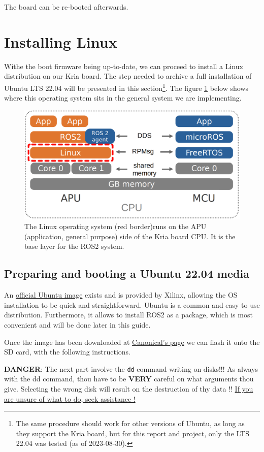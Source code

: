 \documentclass[10pt]{article}
\begin{document}
The board can be re-booted afterwards.
\pagebreak

\section{Installing Linux}
\label{sec:orgc3a362f}
Withe the boot firmware being up-to-date, we can proceed to install a Linux distribution
on our Kria board. The step needed to archive a full installation of Ubuntu LTS 22.04
will be presented in this section\footnote{The same procedure should work for other versions of Ubuntu, as long as they
support the Kria board, but for this report and project, only the LTS 22.04 was tested
(as of 2023-08-30).}. The figure \ref{fig:orga5df0c4} below shows
where this operating system sits in the general system we are implementing.

\begin{figure}[htbp]
\centering
\includegraphics[width=.6\textwidth]{./img/map_linux.png}
\caption{\label{fig:orga5df0c4}The Linux operating system (red border)runs on the APU (application, general purpose) side of the Kria board CPU. It is the base layer for the ROS2 system.}
\end{figure}

\subsection{Preparing and booting a Ubuntu 22.04 media}
\label{sec:orgf9fda62}
An \href{https://ubuntu.com/download/amd-xilinx}{official Ubuntu image} exists and is
provided by Xilinx, allowing the OS installation to be quick and
straightforward.
Ubuntu is a common and easy to use distribution. Furthermore,
it allows to install ROS2 as a package, which is most convenient and will be
done later in this guide.

Once the image has been downloaded at \href{https://ubuntu.com/download/amd-xilinx}{Canonical's page}
we can flash it onto the SD card, with the following instructions.

\begin{tcolorbox}[colback=red!5!white,colframe=red!75!black]
\textbf{DANGER}: The next part involve the \texttt{dd} command writing on disks!!!
As always with the dd command, thou have to be \textbf{VERY} careful on what arguments
thou give. Selecting the wrong disk will result on the destruction of
thy data !!
\uline{If you are unsure of what to do, seek assistance !}
\end{tcolorbox}
\end{document}
